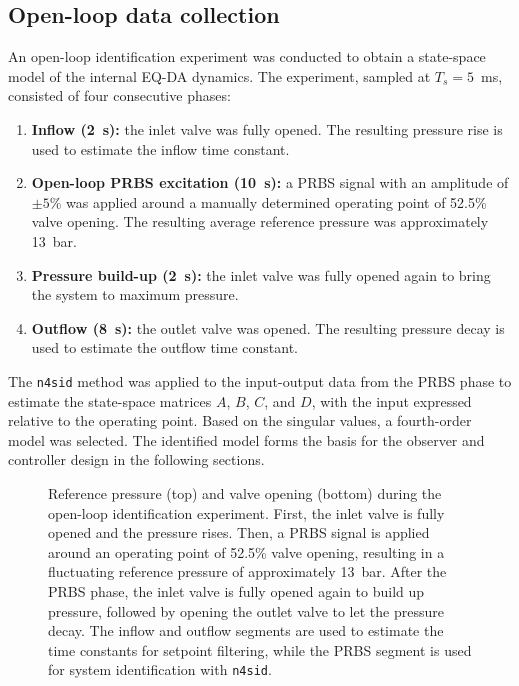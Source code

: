 \documentclass[12pt,a4paper]{article}
\begin{document}
\subsection{Open-loop data collection}
An open-loop identification experiment was conducted to obtain a state-space model of the internal EQ-DA dynamics. The experiment, sampled at $T_s = 5$~ms, consisted of four consecutive phases:
\begin{enumerate}
    \item \textbf{Inflow (2~s):} the inlet valve was fully opened. The resulting pressure rise is used to estimate the inflow time constant.
    \item \textbf{Open-loop PRBS excitation (10~s):} a PRBS signal with an amplitude of $\pm 5\%$ was applied around a manually determined operating point of 52.5\% valve opening. The resulting average reference pressure was approximately 13~bar. %
    \item \textbf{Pressure build-up (2~s):} the inlet valve was fully opened again to bring the system to maximum pressure.
    \item \textbf{Outflow (8~s):} the outlet valve was opened. The resulting pressure decay is used to estimate the outflow time constant.
\end{enumerate}
The \texttt{n4sid} method was applied to the input-output data from the PRBS phase to estimate the state-space matrices $A$, $B$, $C$, and $D$, with the input expressed relative to the operating point. Based on the singular values, a fourth-order model was selected. The identified model forms the basis for the observer and controller design in the following sections.

\begin{figure}[ht!]
    \centering
    
    \caption{Reference pressure (top) and valve opening (bottom) during the open-loop identification experiment. First, the inlet valve is fully opened and the pressure rises. Then, a PRBS signal is applied around an operating point of 52.5\% valve opening, resulting in a fluctuating reference pressure of approximately 13~bar. After the PRBS phase, the inlet valve is fully opened again to build up pressure, followed by opening the outlet valve to let the pressure decay. The inflow and outflow segments are used to estimate the time constants for setpoint filtering, while the PRBS segment is used for system identification with \texttt{n4sid}.}
    \label{fig:identification_results}
\end{figure}
\end{document}
